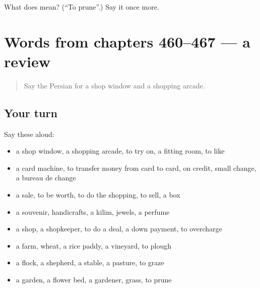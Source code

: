 \begin{tcolorbox}[breakable,colback=teal!4,colframe=teal!35!black,title={Before you move on}]
What does   mean? (\textquotedblleft{}To prune\textquotedblright{}.) Say it once more.
\end{tcolorbox}
\section[(dialogue)]{Words from chapters 460–467 — a review}

\label{lesson:FA-R467-review-460-467}



\begin{quote}
Say the Persian for a shop window and a shopping arcade.
\end{quote}

\subsection*{Your turn}
Say these aloud:

\begin{itemize}
\raggedright
  \item a shop window, a shopping arcade, to try on, a fitting room, to like
  \item a card machine, to transfer money from card to card, on credit, small change, a bureau de change
  \item a sale, to be worth, to do the shopping, to sell, a box
  \item a souvenir, handicrafts, a kilim, jewels, a perfume
  \item a shop, a shopkeeper, to do a deal, a down payment, to overcharge
  \item a farm, wheat, a rice paddy, a vineyard, to plough
  \item a flock, a shepherd, a stable, a pasture, to graze
  \item a garden, a flower bed, a gardener, grass, to prune
\end{itemize}

